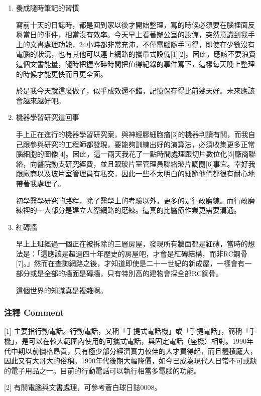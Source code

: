 \documentclass[a5paper, 12pt
]{book}
\begin{document}
\begin{enumerate}
\def\labelenumi{\arabic{enumi}.}
\item
  養成隨時筆記的習慣

  寫前十天的日誌時，都是回到家以後才開始整理，寫的時候必須要在腦裡面反芻當日的事件，相當沒有效率。今天早上看著辦公室的設備，突然意識到我手上的文書處理功能，24小時都非常充沛，不僅電腦隨手可得，即使在少數沒有電腦的狀況，也有其他可以連上網路的攜帶式設備{[}1{]}{[}2{]}。因此，應該不要浪費這個文書能量，隨時把握零碎時間把值得紀錄的事件寫下，這樣每天晚上整理的時候才能更快而且更全面。

  於是我今天就這麼做了，似乎成效還不錯，記憶保存得比前幾天好。未來應該會越來越好吧。
\item
  機器學習研究這回事

  手上正在進行的機器學習研究案，與神經膠細胞瘤{[}3{]}的機器判讀有關，而我自己跟參與研究的工程師都發現，要能夠訓練出好的演算法，必須收集更多正常腦細胞的圖像{[}4{]}。因此，這一兩天我花了一點時間處理跟切片數位化{[}5{]}廠商聯絡，向醫院動支研究經費，並且跟玻片室管理員聯絡玻片調閱{[}6{]}事宜。幸好我跟廠商以及玻片室管理員有私交，因此一些不太明白的細節他們都很有耐心地帶著我處理了。

  初學醫學研究的路程，除了醫學上的考驗以外，更多的是行政磨練。而行政磨練裡的一大部分是建立人際網路的磨練。這真的比醫療作業更需要溝通。
\item
  紅磚牆

  早上上班經過一個正在被拆除的三層房屋，發現所有牆面都是紅磚，當時的想法是：「這應該是超過四十年歷史的房屋吧，才會是紅磚結構，而非RC鋼骨{[}7{]}。」然而在查詢網路之後，才知道即使是二十一世紀的新成屋，一樣會有一部分或是全部的牆面是磚牆，只有特別高的建物會採全部RC鋼骨。

  這個世界的知識真是複雜啊。
\end{enumerate}

\hypertarget{ux6ce8ux91cb-comment-4}{%
\subsubsection{注釋 Comment}\label{ux6ce8ux91cb-comment-4}}

{[}1{]}
主要指行動電話。行動電話，又稱「手提式電話機」或「手提電話」，簡稱「手機」，是可以在較大範圍內使用的可攜式電話，與固定電話（座機）相對。1990年代中期以前價格昂貴，只有極少部分經濟實力較佳的人才買得起，而且體積龐大，因此又有大哥大的俗稱。1990年代後期大幅降價，如今已成為現代人日常不可或缺的電子用品之一。目前的行動電話可以執行相當多電腦的功能。

{[}2{]} 有關電腦與文書處理，可參考蒼白球日誌0008。
\end{document}
